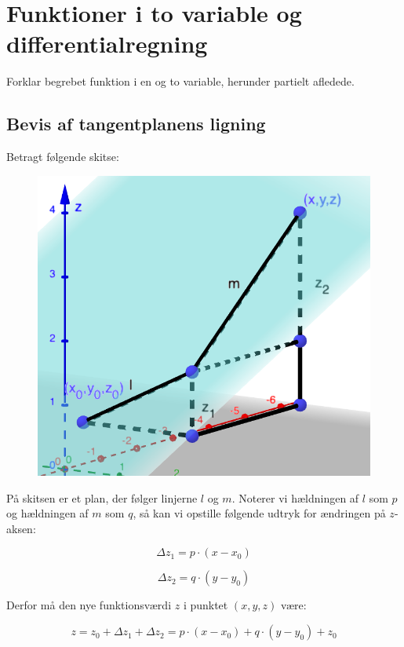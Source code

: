 
\section{Funktioner i to variable og differentialregning}

Forklar begrebet funktion i en og to variable, herunder partielt afledede. 

\subsection{Bevis af tangentplanens ligning}

\begin{proofw}

Betragt følgende skitse:

\begin{figure}[h]
    \centering
    \includegraphics[scale=0.5]{skitser/tangent_plan.png}
\end{figure}

På skitsen er et plan, der følger linjerne $l$ og $m$.
Noterer vi hældningen af $l$ som $p$ og hældningen af $m$ som $q$,
så kan vi opstille følgende udtryk for ændringen på $z$-aksen:

$$
    \Delta z_1=p \cdot (x-x_0)
$$

$$
    \Delta z_2=q \cdot (y-y_0)
$$

Derfor må den nye funktionsværdi $z$ i punktet $(x,y,z)$ være:

$$
    z=z_0+\Delta z_1+\Delta z_2=p \cdot (x-x_0)+q \cdot (y-y_0) + z_0
$$


\end{proofw}
